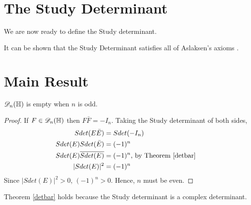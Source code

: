 \section{The Study Determinant}

We are now ready to define the Study determinant.


\begin{ex}

\end{ex}

It can be shown that the Study Determinant satisfies all of Aslaksen's axioms \cite{aslaksen}.

\section{Main Result}
\begin{prop}
 $_n(\HH)$ is empty when $n$ is odd.
\end{prop}
\begin{proof}
	If $F \in {}_{n}(\HH)$ then $F\bar{F} = -I_n$. \newline Taking the Study determinant of both sides, 
	\begin{align*}
		Sdet(E\bar{E}) &= Sdet(-I_n) \\
		Sdet(E)Sdet(\bar{E}) &= (-1)^n \\
		Sdet(E)\overline{Sdet(E)} &= (-1)^n \text{, by Theorem \ref{detbar}} \\
		|Sdet(E)|^2 &= (-1)^n
	\end{align*}
	Since $|Sdet(E)|^2 > 0$, $(-1)^n > 0$. Hence, $n$ must be even.
\end{proof}

\begin{remark}
	Theorem \ref{detbar} holds because the Study determinant is a complex determinant.
\end{remark}